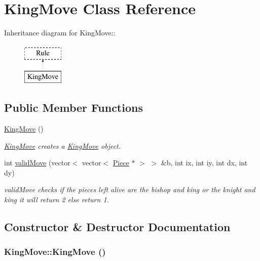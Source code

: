 \hypertarget{classKingMove}{
\section{KingMove Class Reference}
\label{classKingMove}
}
Inheritance diagram for KingMove::\begin{figure}[H]
\begin{center}
\leavevmode
\includegraphics[height=2cm]{classKingMove}
\end{center}
\end{figure}
\subsection*{Public Member Functions}
\begin{DoxyCompactItemize}
\item 
\hyperlink{classKingMove_a6ab2c891e1498dead1e1d7df7e4a9924}{KingMove} ()
\begin{DoxyCompactList}\small\item\em \hyperlink{classKingMove}{KingMove} creates a \hyperlink{classKingMove}{KingMove} object. \item\end{DoxyCompactList}\item 
int \hyperlink{classKingMove_a2c3086623fc47b43cef95ba6ee95915b}{validMove} (vector$<$ vector$<$ \hyperlink{classPiece}{Piece} $\ast$ $>$ $>$ \&b, int ix, int iy, int dx, int dy)
\begin{DoxyCompactList}\small\item\em validMove checks if the pieces left alive are the bishop and king or the knight and king it will return 2 else return 1. \item\end{DoxyCompactList}\end{DoxyCompactItemize}


\subsection{Constructor \& Destructor Documentation}
\hypertarget{classKingMove_a6ab2c891e1498dead1e1d7df7e4a9924}{
\subsubsection[{KingMove}]{\setlength{\rightskip}{0pt plus 5cm}KingMove::KingMove ()}}
\label{classKingMove_a6ab2c891e1498dead1e1d7df7e4a9924}


